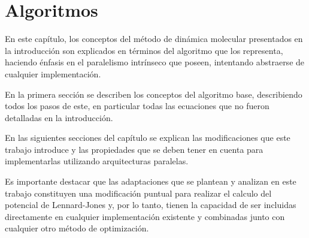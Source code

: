 
\chapter{Algoritmos}


En este capítulo, los conceptos del m\'etodo de dinámica molecular presentados en la introducción son explicados en términos del algoritmo que los representa,
haciendo énfasis en el paralelismo intrínseco que poseen, intentando abstraerse de cualquier implementación.

En la primera sección se describen los conceptos del algoritmo base, describiendo todos los pasos de este, en particular todas las ecuaciones que no fueron detalladas en la introducción. 

En las siguientes secciones del capítulo se explican las modificaciones que este trabajo introduce y las propiedades que se deben tener en cuenta para implementarlas utilizando arquitecturas paralelas.

Es importante destacar que las adaptaciones que se plantean y analizan en este trabajo constituyen una modificación puntual para realizar el calculo del potencial de Lennard-Jones y, por lo tanto, 
tienen la capacidad de ser incluidas directamente en cualquier implementación existente y combinadas junto con cualquier otro método de optimización.






